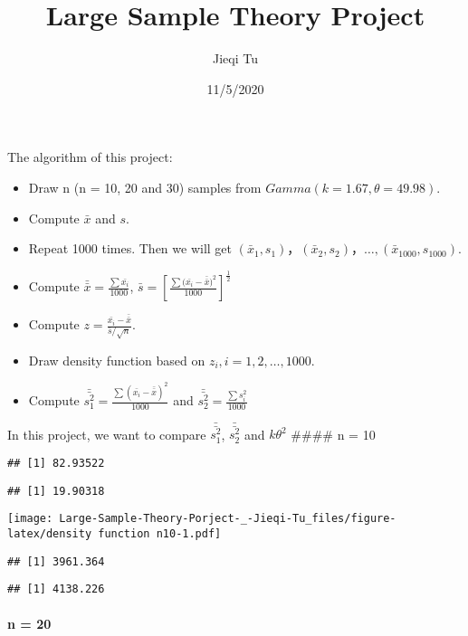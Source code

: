 \documentclass[]{article}
\title{Large Sample Theory Project}
\author{Jieqi Tu}
\date{11/5/2020}
\providecommand{\tightlist}{%
  \setlength{\itemsep}{0pt}\setlength{\parskip}{0pt}}
\let\oldparagraph\paragraph
\renewcommand{\paragraph}[1]{\oldparagraph{#1}\mbox{}}
\begin{document}
\maketitle

The algorithm of this project:

\begin{itemize}
\tightlist
\item
  Draw n (n = 10, 20 and 30) samples from
  \(Gamma(k=1.67, \theta=49.98)\).
\item
  Compute \(\bar x\) and \(s\).
\item
  Repeat 1000 times. Then we will get
  \((\bar x_1, s_1)，(\bar x_2, s_2)，…,(\bar x_{1000}, s_{1000})\).
\item
  Compute \(\bar{\bar{x}}=\frac{\sum\bar{x_i}}{1000}\),
  \(\bar{s}=[\frac{\sum{(\bar{x_i}-\bar{\bar{x}}})^2}{1000}]^{\frac{1}{2}}\)
\item
  Compute \(z=\frac{\bar{x_i}-\bar{\bar{x}}}{\bar s/\sqrt{n}}\).
\item
  Draw density function based on \(z_i, i=1, 2, …,1000\).
\item
  Compute
  \(\bar{\bar{s_1^2}}=\frac{\sum{(\bar{x_i}-\bar{\bar{x}})^2}}{1000}\)
  and \(\bar{\bar{s_2^2}}=\frac{\sum{s_i^2}}{1000}\)
\end{itemize}

In this project, we want to compare \(\bar{\bar{s_1^2}}\),
\(\bar{\bar{s_2^2}}\) and \(k\theta^2\) \#\#\#\# n = 10

\begin{verbatim}
## [1] 82.93522
\end{verbatim}

\begin{verbatim}
## [1] 19.90318
\end{verbatim}

\texttt{[image: Large-Sample-Theory-Porject-\_-Jieqi-Tu\_files/figure-latex/density function n10-1.pdf]}

\begin{verbatim}
## [1] 3961.364
\end{verbatim}

\begin{verbatim}
## [1] 4138.226
\end{verbatim}

\hypertarget{n-20}{%
\paragraph{n = 20}\label{n-20}}
\end{document}
